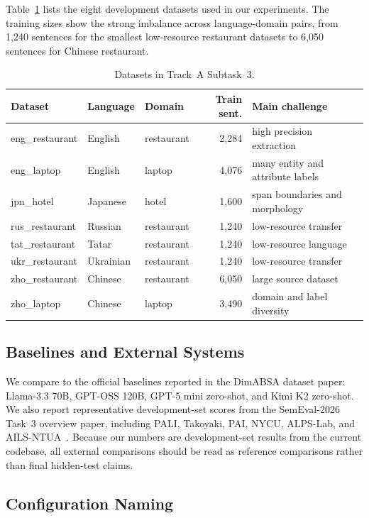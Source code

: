 \documentclass[runningheads]{llncs}
\begin{document}
Table~\ref{tab:data} lists the eight development datasets used in our
experiments. The training sizes show the strong imbalance across
language-domain pairs, from 1,240 sentences for the smallest
low-resource restaurant datasets to 6,050 sentences for Chinese
restaurant.

\begin{table}[!h]
\centering
\caption{Datasets in Track~A Subtask~3.}
\label{tab:data}
\footnotesize
\begin{tabular}{lllrl}
\toprule
Dataset & Language & Domain & Train sent. & Main challenge \\
\midrule
eng\_restaurant & English & restaurant & 2,284 & high precision extraction \\
eng\_laptop & English & laptop & 4,076 & many entity and attribute labels \\
jpn\_hotel & Japanese & hotel & 1,600 & span boundaries and morphology \\
rus\_restaurant & Russian & restaurant & 1,240 & low-resource transfer \\
tat\_restaurant & Tatar & restaurant & 1,240 & low-resource language \\
ukr\_restaurant & Ukrainian & restaurant & 1,240 & low-resource transfer \\
zho\_restaurant & Chinese & restaurant & 6,050 & large source dataset \\
zho\_laptop & Chinese & laptop & 3,490 & domain and label diversity \\
\bottomrule
\end{tabular}
\end{table}

\subsection{Baselines and External Systems}

We compare to the official baselines reported in the DimABSA dataset
paper: Llama-3.3 70B, GPT-OSS 120B, GPT-5 mini zero-shot, and Kimi K2
zero-shot. We also report representative development-set scores from
the SemEval-2026 Task~3 overview paper, including PALI, Takoyaki, PAI,
NYCU, ALPS-Lab, and AILS-NTUA~\cite{overview2026,ailsntua2026}. Because our numbers are development-set
results from the current codebase, all external comparisons should be
read as reference comparisons rather than final hidden-test claims.

\subsection{Configuration Naming}
\end{document}
